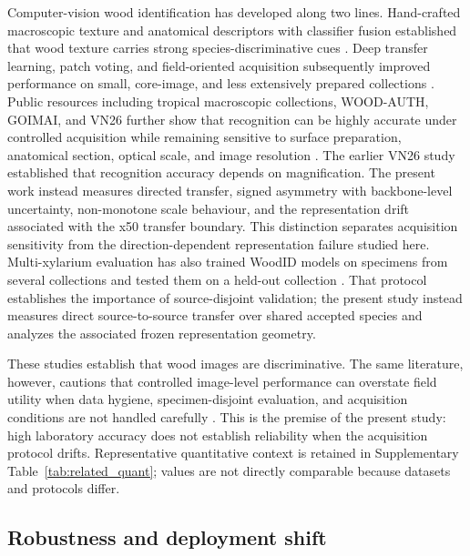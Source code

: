 \documentclass[a4paper,fleqn]{els-cas-templates/cas-sc}
\begin{document}
Computer-vision wood identification has developed along two lines. Hand-crafted
macroscopic texture and anatomical descriptors with classifier fusion established
that wood texture carries strong species-discriminative cues
\citep{paulafilho2014forest,souza2020brazilian}. Deep transfer learning, patch
voting, and field-oriented acquisition subsequently improved performance on
small, core-image, and less extensively prepared collections
\citep{sun2021smallwood,fabijanska2021woodcore,degeus2021amazon,ravindran2021field}.
Public resources including tropical macroscopic collections, WOOD-AUTH, GOIMAI,
and VN26 further show that recognition can be highly accurate under controlled
acquisition while remaining sensitive to surface preparation, anatomical
section, optical scale, and image resolution
\citep{canosaenz2022tropical,barmpoutis2018woodauth,herrera2026goimai,nguyentrong2023magnification}.
The earlier VN26 study established that recognition accuracy depends on
magnification. The present work instead measures directed transfer, signed
asymmetry with backbone-level uncertainty, non-monotone scale behaviour, and
the representation drift associated with the x50 transfer boundary. This
distinction separates acquisition sensitivity from the direction-dependent
representation failure studied here.
Multi-xylarium evaluation has also trained WoodID models on specimens from
several collections and tested them on a held-out collection
\citep{ravindran2022multixylarium}. That protocol establishes the importance of
source-disjoint validation; the present study instead measures direct
source-to-source transfer over shared accepted species and analyzes the
associated frozen representation geometry.

These studies establish that wood images are discriminative. The same literature,
however, cautions that controlled image-level performance can overstate field
utility when data hygiene, specimen-disjoint evaluation, and acquisition
conditions are not handled carefully
\citep{hermanson2011review,ravindran2022caveat}. This is the premise of the
present study: high laboratory accuracy does not establish reliability when the
acquisition protocol drifts. Representative quantitative context is retained in
Supplementary Table~\ref{tab:related_quant}; values are not directly comparable
because datasets and protocols differ.

\subsection{Robustness and deployment shift}
\end{document}
